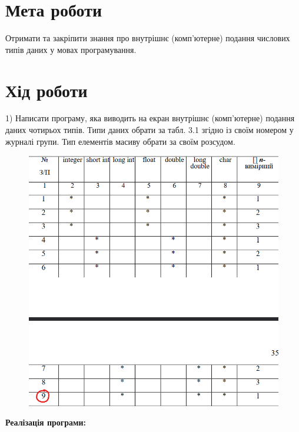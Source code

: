 \section{Мета роботи}
Отримати та закріпити знання про внутрішнє (комп’ютерне) подання числових типів даних у мовах програмування.

\section{Хід роботи}
1) Написати програму, яка виводить на екран внутрішнє (комп’ютерне)
подання даних чотирьох типів. Типи даних обрати за табл. 3.1 згідно із своїм
номером у журналі групи. Тип елементів масиву обрати за своїм розсудом.

\begin{figure}[h!]
    \centering
    \includegraphics[width=16cm]{reports/algos/lab3/assets/1.png}
\end{figure}

\clearpage
\textbf{Реалізація програми:}

